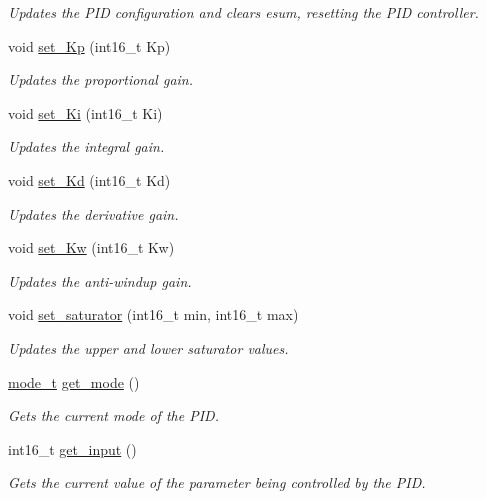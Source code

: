 \begin{DoxyCompactItemize}
\begin{DoxyCompactList}\small\item\em Updates the P\-I\-D configuration and clears esum, resetting the P\-I\-D controller. \end{DoxyCompactList}\item 
void \hyperlink{classpid_adef385c61aa547f8cff8ec95c9a37b72}{set\-\_\-\-Kp} (int16\-\_\-t Kp)
\begin{DoxyCompactList}\small\item\em Updates the proportional gain. \end{DoxyCompactList}\item 
void \hyperlink{classpid_a81c384e57c6a8ff97d4baf1f9cd04b9e}{set\-\_\-\-Ki} (int16\-\_\-t Ki)
\begin{DoxyCompactList}\small\item\em Updates the integral gain. \end{DoxyCompactList}\item 
void \hyperlink{classpid_a363680a4d29f3bd7ffb132e5a90cb10c}{set\-\_\-\-Kd} (int16\-\_\-t Kd)
\begin{DoxyCompactList}\small\item\em Updates the derivative gain. \end{DoxyCompactList}\item 
void \hyperlink{classpid_ad125031ba4fe5b30657259689e726768}{set\-\_\-\-Kw} (int16\-\_\-t Kw)
\begin{DoxyCompactList}\small\item\em Updates the anti-\/windup gain. \end{DoxyCompactList}\item 
void \hyperlink{classpid_a2953f2df6e262b7c04443943607aadf5}{set\-\_\-saturator} (int16\-\_\-t min, int16\-\_\-t max)
\begin{DoxyCompactList}\small\item\em Updates the upper and lower saturator values. \end{DoxyCompactList}\item 
\hyperlink{classpid_a22af7b8da10bf9878ae85f6a90991054}{mode\-\_\-t} \hyperlink{classpid_aeea9fa7d073c56415ed8aaec6cb8ce95}{get\-\_\-mode} ()
\begin{DoxyCompactList}\small\item\em Gets the current mode of the P\-I\-D. \end{DoxyCompactList}\item 
int16\-\_\-t \hyperlink{classpid_a6e4adafe020340b1d3630277db554c90}{get\-\_\-input} ()
\begin{DoxyCompactList}\small\item\em Gets the current value of the parameter being controlled by the P\-I\-D. \end{DoxyCompactList}\item 

\end{DoxyCompactItemize}
